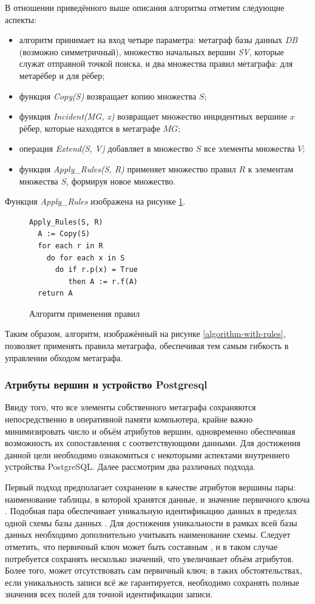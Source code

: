 В отношении приведённого выше описания алгоритма отметим следующие аспекты:
\begin{itemize}
  \item алгоритм принимает на вход четыре параметра: метаграф базы данных \textit{DB} (возможно симметричный), множество начальных вершин \textit{SV}, которые служат отправной точкой поиска, и два множества правил метаграфа: для метарёбер и для рёбер;
  \item функция \textit{Copy(S)} возвращает копию множества $S$;
  \item функция \textit{Incident(MG, x)} возвращает множество инцидентных вершине $x$ рёбер, которые находятся в метаграфе $MG$;
  \item операция \textit{Extend(S, V)} добавляет в множество $S$ все элементы множества $V$;
  \item функция \textit{Apply\_Rules(S, R)} применяет множество правил $R$ к элементам множества $S$, формируя новое множество.
\end{itemize}

Функция \textit{Apply\_Rules} изображена на рисунке \ref{apply-rules}.

\begin{figure}
  \begin{lstlisting}
Apply_Rules(S, R)
  A := Copy(S)
  for each r in R
    do for each x in S
      do if r.p(x) = True
         then A := r.f(A)
  return A
  \end{lstlisting}
  \caption{Алгоритм применения правил}
  \label{apply-rules}
\end{figure}

Таким образом, алгоритм, изображённый на рисунке \ref{algorithm-with-rules}, позволяет применять правила метаграфа, обеспечивая тем самым гибкость в управлении обходом метаграфа.

\subsubsection{Атрибуты вершин и устройство Postgresql}
Ввиду того, что все элементы собственного метаграфа сохраняются непосредственно в оперативной памяти компьютера, крайне важно минимизировать число и объём атрибутов вершин, одновременно обеспечивая возможность их сопоставления с соответствующими данными. Для достижения данной цели необходимо ознакомиться с некоторыми аспектами внутреннего устройства PostgreSQL. Далее рассмотрим два различных подхода.

Первый подход предполагает сохранение в качестве атрибутов вершины пары: наименование таблицы, в которой хранятся данные, и значение первичного ключа \cite{pg-pk}. Подобная пара обеспечивает уникальную идентификацию данных в пределах одной схемы базы данных \cite{pg-schemas}. Для достижения уникальности в рамках всей базы данных необходимо дополнительно учитывать наименование схемы. Следует отметить, что первичный ключ может быть составным \cite{pg-pk-composite}, и в таком случае потребуется сохранять несколько значений, что увеличивает объём атрибутов. Более того, может отсутствовать сам первичный ключ; в таких обстоятельствах, если уникальность записи всё же гарантируется, необходимо сохранять полные значения всех полей для точной идентификации записи.

